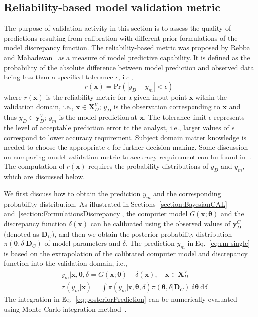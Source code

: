 \documentclass[preprint,review,12pt,3p]{elsarticle}
\begin{document}
\subsection{Reliability-based model validation metric}\label{section:modelValidation}
The purpose of validation activity in this section is to assess the quality of predictions resulting from calibration with different prior formulations of the model discrepancy function. The reliability-based metric was proposed by Rebba and Mahadevan~\citep{Rebba2008} as a measure of model predictive capability. It is def{}ined as the probability of the absolute dif{}ference between model prediction and observed data being less than a specified tolerance $\epsilon$, i.e.,
\begin{equation}\label{eq:rm-single}
r(\boldsymbol{x}) = \mathrm{Pr}(|y_D-y_m|<\epsilon)
\end{equation}
where $r(\boldsymbol{x})$ is the reliability metric for a given input point $\boldsymbol{x}$ within the validation domain, i.e., $\boldsymbol{x} \in \boldsymbol{X}_D^V$; $y_D$ is the observation corresponding to $\boldsymbol{x}$ and thus $y_D \in \boldsymbol{y}_D^V$; $y_m$ is the model prediction at $\boldsymbol{x}$.  The tolerance limit $\epsilon$ represents the level of acceptable prediction error to the analyst, i.e., larger values of $\epsilon$ correspond to lower accuracy requirement. Subject domain matter knowledge is needed to choose the appropriate $\epsilon$ for further decision-making. Some discussion on comparing model validation metric to accuracy requirement can be found in~\citep{Oberkampf2006}. The computation of $r(\boldsymbol{x})$ requires the probability distributions of $y_D$ and $y_m$, which are discussed below.

We first discuss how to obtain the prediction $y_m$ and the corresponding probability distribution. As illustrated in Sections~\ref{section:BayesianCAL} and~\ref{section:FormulationsDiscrepancy}, the computer model $G(\boldsymbol{x};\boldsymbol{\theta})$ and the discrepancy function $\delta(\boldsymbol{
x})$ can be calibrated using the observed values of $\boldsymbol{y}_D^C$ (denoted as $\boldsymbol{D}_C$), and then we obtain the posterior probability distribution $\pi(\boldsymbol{\theta},\delta|\boldsymbol{D}_C)$ of model parameters and $\delta$. The prediction $y_m$ in Eq.~\ref{eq:rm-single} is based on the extrapolation of the calibrated computer model and discrepancy function into the validation domain, i.e., 
\begin{eqnarray}\label{eq:posteriorPrediction}
&&y_m|\boldsymbol{x},\boldsymbol{\theta},\delta = G(\boldsymbol{x};\boldsymbol{\theta})+\delta(\boldsymbol{x}), \quad \boldsymbol{x} \in \boldsymbol{X}_D^V \nonumber\\
&&\pi(y_m|\boldsymbol{x})=\int \pi(y_m|\boldsymbol{x},\boldsymbol{\theta},\delta) \pi(\boldsymbol{\theta}, \delta | \boldsymbol{D}_C) \ \mathrm{d} \boldsymbol{\theta} \ \mathrm{d} \delta
\end{eqnarray}
The integration in Eq.~\ref{eq:posteriorPrediction} can be numerically evaluated using Monte Carlo integration method~\citep{Zwillinger1992}. 
\end{document}
